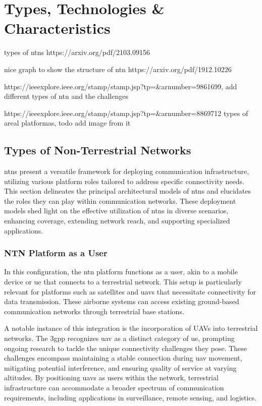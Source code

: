 \chapter{Types, Technologies \& Characteristics}\label{ch:types_technologies_characteristics}

types of ntns
https://arxiv.org/pdf/2103.09156

nice graph to show the structure of ntn
https://arxiv.org/pdf/1912.10226

https://ieeexplore.ieee.org/stamp/stamp.jsp?tp=&arnumber=9861699, add different types of ntn and the challenges

https://ieeexplore.ieee.org/stamp/stamp.jsp?tp=&arnumber=8869712
types of areal platformas, todo add image from it


\section{Types of Non-Terrestrial Networks}\label{sec:types_of_non_terrestrial_networks}

\glspl{ntn} present a versatile framework for deploying communication infrastructure, utilizing various platform roles tailored to address specific connectivity needs. This section delineates the principal architectural models of \glspl{ntn} and elucidates the roles they can play within communication networks. These deployment models shed light on the effective utilization of \glspl{ntn} in diverse scenarios, enhancing coverage, extending network reach, and supporting specialized applications.


\subsection{NTN Platform as a User}\label{subsec:ntn_platform_as_a_user}

In this configuration, the \gls{ntn} platform functions as a user, akin to a mobile device or \gls{ue} that connects to a terrestrial network. This setup is particularly relevant for platforms such as satellites and \glspl{uav} that necessitate connectivity for data transmission. These airborne systems can access existing ground-based communication networks through terrestrial base stations.

A notable instance of this integration is the incorporation of UAVs into terrestrial networks. The \gls{3gpp} recognizes \gls{uav} as a distinct category of \gls{ue}, prompting ongoing research to tackle the unique connectivity challenges they pose. These challenges encompass maintaining a stable connection during \gls{uav} movement, mitigating potential interference, and ensuring quality of service at varying altitudes. By positioning \glspl{uav} as users within the network, terrestrial infrastructure can accommodate a broader spectrum of communication requirements, including applications in surveillance, remote sensing, and logistics.

